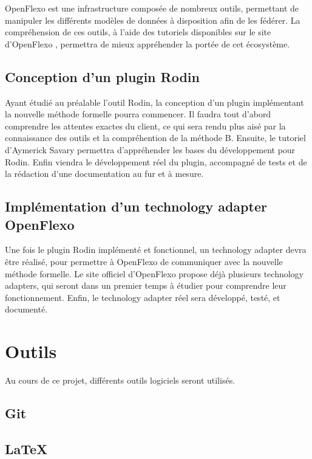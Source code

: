 \documentclass{article}
\begin{document}
OpenFlexo est une infrastructure composée de nombreux outils, permettant de manipuler les différents modèles de données à disposition afin de les fédérer.
La compréhension de ces outils, à l'aide des tutoriels disponibles sur le site d'OpenFlexo \cite{openflexodoc}, permettra de mieux appréhender la portée de cet écosystème.

\subsection{Conception d'un plugin Rodin}

Ayant étudié au préalable l'outil Rodin, la conception d'un plugin implémentant la nouvelle méthode formelle pourra commencer.
Il faudra tout d'abord comprendre les attentes exactes du client, ce qui sera rendu plus aisé par la connaissance des outils et la compréhention de la méthode B.
Ensuite, le tutoriel d'Aymerick Savary \cite{asavary} permettra d'appréhender les bases du développement pour Rodin.
Enfin viendra le développement réel du plugin, accompagné de tests et de la rédaction d'une documentation au fur et à mesure.

\subsection{Implémentation d'un technology adapter OpenFlexo}

Une fois le plugin Rodin implémenté et fonctionnel, un technology adapter devra être réalisé, pour permettre à OpenFlexo de communiquer avec la nouvelle méthode formelle.
Le site officiel d'OpenFlexo \cite{openflexodoc} propose déjà plusieurs technology adapters, qui seront dans un premier temps à étudier pour comprendre leur fonctionnement.
Enfin, le technology adapter réel sera développé, testé, et documenté.


\section{Outils}

Au cours de ce projet, différents outils logiciels seront utilisés.

\subsection{Git}

\subsection{\LaTeX}
\end{document}
